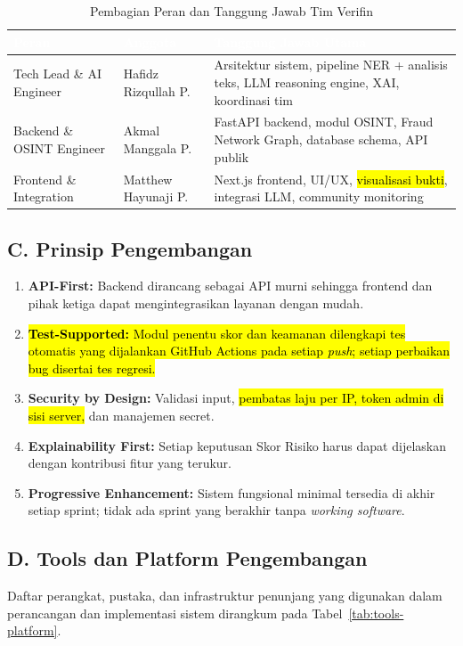 \documentclass[12pt,a4paper]{article}
\newcommand{\revisi}[1]{\hl{#1}}
\newcommand{\thead}[1]{\textcolor{white}{\textbf{#1}}}
\begin{document}
\begin{table}[H]
\centering
\caption{Pembagian Peran dan Tanggung Jawab Tim Verifin}
\label{tab:team-roles}
\small
\begin{tabularx}{\linewidth}{|p{3.8cm}|p{3.2cm}|Y|}
\hline
{}\thead{Peran} & \thead{Anggota} & \thead{Tanggung Jawab Utama} \\
\hline
{}
Tech Lead \& AI Engineer & Hafidz Rizqullah P. & Arsitektur sistem, pipeline NER + analisis teks, LLM reasoning engine, XAI, koordinasi tim \\ \hline
Backend \& OSINT Engineer & Akmal Manggala P. & FastAPI backend, modul OSINT, Fraud Network Graph, database schema, API publik \\ \hline
{}
Frontend \& Integration & Matthew Hayunaji P. & Next.js frontend, UI/UX, \revisi{visualisasi bukti}, integrasi LLM, community monitoring \\ \hline
\end{tabularx}
\end{table}

\subsection*{C. Prinsip Pengembangan}

\begin{enumerate}[label=\textbf{\arabic*.}]
\item \textbf{API-First:} Backend dirancang sebagai API murni sehingga frontend dan pihak ketiga
      dapat mengintegrasikan layanan dengan mudah.
\item \revisi{\textbf{Test-Supported:} Modul penentu skor dan keamanan dilengkapi tes otomatis yang dijalankan GitHub Actions pada setiap \textit{push}; setiap perbaikan bug disertai tes regresi.}
\item \textbf{Security by Design:} Validasi input, \revisi{pembatas laju per IP, token admin di sisi server,} dan manajemen secret.
\item \textbf{Explainability First:} Setiap keputusan Skor Risiko harus dapat dijelaskan dengan
      kontribusi fitur yang terukur.
\item \textbf{Progressive Enhancement:} Sistem fungsional minimal tersedia di akhir setiap sprint;
      tidak ada sprint yang berakhir tanpa \textit{working software}.
\end{enumerate}

\subsection*{D. Tools dan Platform Pengembangan}
Daftar perangkat, pustaka, dan infrastruktur penunjang yang digunakan dalam perancangan dan implementasi sistem dirangkum pada Tabel~\ref{tab:tools-platform}.
\end{document}
